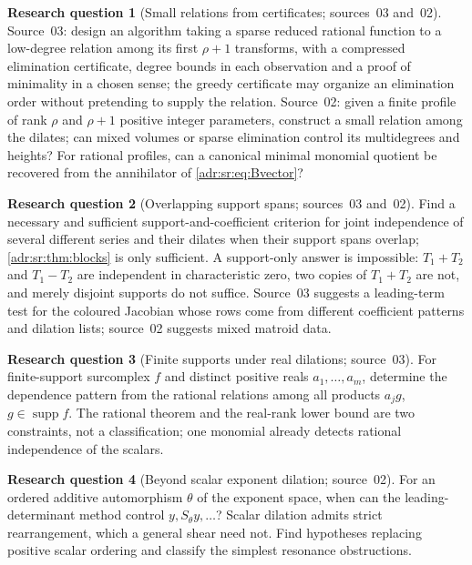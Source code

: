 \documentclass[11pt,letterpaper]{article}
\numberwithin{equation}{section}
\theoremstyle{definition}
\newtheorem{question}{Research question}
\theoremstyle{remark}
\newcommand{\supp}{\operatorname{supp}}
\begin{document}
\begin{question}[Small relations from certificates; sources~03 and~02]
Source~03: design an algorithm taking a sparse reduced rational function to a
low-degree relation among its first $\rho+1$ transforms, with a compressed
elimination certificate, degree bounds in each observation and a proof of
minimality in a chosen sense; the greedy certificate may organize an
elimination order without pretending to supply the relation. Source~02: given
a finite profile of rank $\rho$ and $\rho+1$ positive integer parameters,
construct a small relation among the dilates; can mixed volumes or sparse
elimination control its multidegrees and heights? For rational profiles, can a
canonical minimal monomial quotient be recovered from the annihilator of
\eqref{adr:sr:eq:Bvector}?
\end{question}

\begin{question}[Overlapping support spans; sources~03 and~02]
Find a necessary and sufficient support-and-coefficient criterion for joint
independence of several different series and their dilates when their support
spans overlap; \cref{adr:sr:thm:blocks} is only sufficient. A support-only
answer is impossible: $T_1+T_2$ and $T_1-T_2$ are independent in characteristic
zero, two copies of $T_1+T_2$ are not, and merely disjoint supports do not
suffice. Source~03 suggests a leading-term test for the coloured Jacobian whose
rows come from different coefficient patterns and dilation lists; source~02
suggests mixed matroid data.
\end{question}

\begin{question}[Finite supports under real dilations; source~03]
For finite-support surcomplex $f$ and distinct positive reals
$a_1,\ldots,a_m$, determine the dependence pattern from the rational relations
among all products $a_jg$, $g\in\supp f$. The rational theorem and the
real-rank lower bound are two constraints, not a classification; one monomial
already detects rational independence of the scalars.
\end{question}

\begin{question}[Beyond scalar exponent dilation; source~02]
For an ordered additive automorphism $\theta$ of the exponent space, when can
the leading-determinant method control $y,S_\theta y,\ldots$? Scalar dilation
admits strict rearrangement, which a general shear need not. Find hypotheses
replacing positive scalar ordering and classify the simplest resonance
obstructions.
\end{question}
\end{document}
